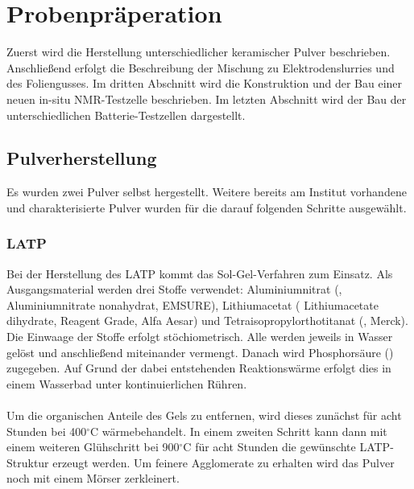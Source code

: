 \documentclass[a4paper, 11pt, headsepline,footsepline,twoside,abstract]{scrbook}
\begin{document}
\chapter{Probenpräperation}
Zuerst wird die Herstellung unterschiedlicher keramischer Pulver beschrieben. Anschließend erfolgt die Beschreibung der Mischung zu Elektrodenslurries und des Foliengusses. Im dritten Abschnitt wird die Konstruktion und der Bau einer neuen in-situ NMR-Testzelle beschrieben. Im letzten Abschnitt wird der Bau der unterschiedlichen Batterie-Testzellen dargestellt. 
\section{Pulverherstellung}
Es wurden zwei Pulver selbst hergestellt. Weitere bereits am Institut vorhandene und charakterisierte Pulver wurden für die darauf folgenden Schritte ausgewählt.
\subsection{LATP}
Bei der Herstellung des LATP kommt das Sol-Gel-Verfahren zum Einsatz. Als Ausgangsmaterial werden drei Stoffe verwendet: Aluminiumnitrat (, Aluminiumnitrate nonahydrat, EMSURE), Lithiumacetat ( Lithiumacetate dihydrate, Reagent Grade, Alfa Aesar) und Tetra\-iso\-propyl\-ortho\-titanat (, Merck). Die Einwaage der Stoffe erfolgt stöchiometrisch. Alle werden jeweils in Wasser gelöst und anschließend miteinander vermengt. Danach wird Phosphorsäure () zugegeben. Auf Grund der dabei entstehenden Reaktionswärme erfolgt dies in einem Wasserbad unter kontinuierlichen Rühren.
\\\\
Um die organischen Anteile des Gels zu entfernen, wird dieses zunächst für acht Stunden bei 400$^\circ$C wärmebehandelt. In einem zweiten Schritt kann dann mit einem weiteren Glühschritt bei 900$^\circ$C für acht Stunden die gewünschte LATP-Struktur erzeugt werden. Um feinere Agglomerate zu erhalten wird das Pulver noch mit einem Mörser zerkleinert.
\end{document}
